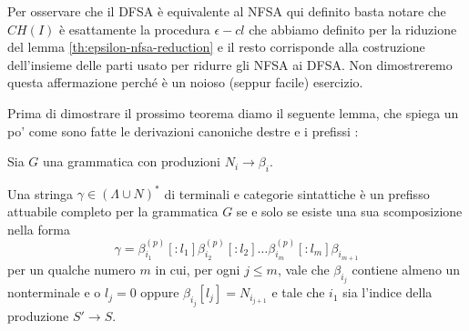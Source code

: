 \documentclass[12pt]{article}
\numberwithin{theorem}{subsection}
\begin{document}
Per osservare che il DFSA è equivalente al NFSA qui definito basta notare che $CH(I)$ è esattamente la procedura $\epsilon-cl$ che abbiamo definito per la riduzione del lemma \ref{th:epsilon-nfsa-reduction} e il resto corrisponde alla costruzione dell'insieme delle parti usato per ridurre gli NFSA ai DFSA.
Non dimostreremo questa affermazione perché è un noioso (seppur facile) esercizio.

Prima di dimostrare il prossimo teorema diamo il seguente lemma, che spiega un po' come sono fatte le derivazioni canoniche destre e i prefissi :
\begin{lemma}\label{th:carat-pref-attuabili-compl}
	Sia $G$ una grammatica con produzioni $N_i \rightarrow \beta_i$.

	Una stringa $\gamma \in \left( \Lambda \cup N \right)^*$ di terminali e categorie sintattiche è un prefisso attuabile completo per la grammatica $G$ se e solo se esiste una sua scomposizione nella forma
	\[
	\gamma = \beta_{i_1}^{(p)}[:l_1] \beta_{i_2}^{(p)}[:l_2] \dots \beta_{i_m}^{(p)}[:l_m] \beta_{i_{m+1}}
	\]
	per un qualche numero $m$ in cui, per ogni $j \le m$, vale che $\beta_{i_j}$ contiene almeno un nonterminale e o $l_j = 0$ oppure $\beta_{i_j}[l_j] = N_{i_{j + 1}}$ e tale che $i_1$ sia l'indice della produzione $S' \rightarrow S$.
\end{lemma}
\end{document}
